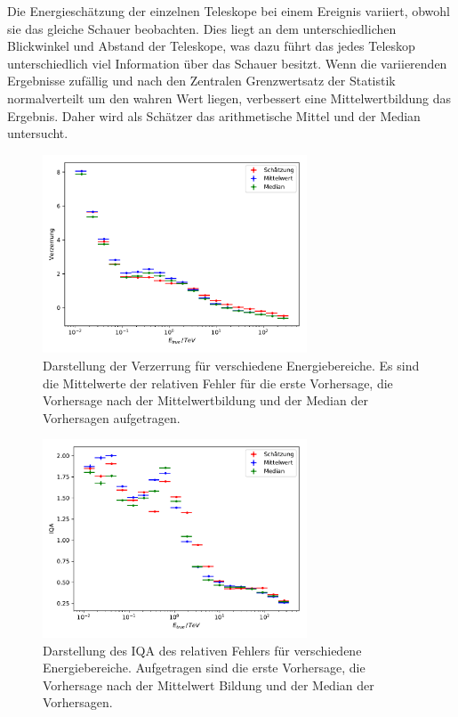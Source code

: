 Die Energieschätzung der einzelnen Teleskope bei einem Ereignis variiert, obwohl sie das gleiche Schauer beobachten.
Dies liegt an dem unterschiedlichen Blickwinkel und Abstand der Teleskope, was dazu führt das jedes Teleskop unterschiedlich viel Information über das
Schauer besitzt.
Wenn die variierenden Ergebnisse zufällig und nach den Zentralen Grenzwertsatz der Statistik normalverteilt um den
wahren Wert liegen\cite[10]{zufall_Fehler}, verbessert eine Mittelwertbildung das Ergebnis.
Daher wird als Schätzer das arithmetische Mittel und der Median untersucht.
\begin{figure}
  \includegraphics[width=0.7\textwidth]{Plots/RF_mean_bias.pdf}
  \centering
  \caption{Darstellung der Verzerrung für verschiedene Energiebereiche. Es sind die Mittelwerte der relativen Fehler für die erste Vorhersage, die Vorhersage
          nach der Mittelwertbildung und der Median der Vorhersagen aufgetragen.}
  \label{abb:mean_median_bias}
\end{figure}
\begin{figure}
  \includegraphics[width=0.7\textwidth]{Plots/RF_mean_resolution.pdf}
  \centering
  \caption{Darstellung des IQA des relativen Fehlers für verschiedene Energiebereiche. Aufgetragen sind die erste Vorhersage, die Vorhersage
          nach der Mittelwert Bildung und der Median der Vorhersagen.}
  \label{abb:mean_median_IQA}
\end{figure}

